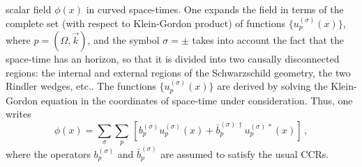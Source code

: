 scalar field $\phi(x)$ in curved space-times. One expands the
field in terms of the complete set (with respect to Klein-Gordon
product) of functions $\{u_p^{(\sigma)}(x)\}$, where $p=(\Omega,
{\vec k})$, and the symbol $\sigma = \pm$ takes into account the
fact that the space-time has an horizon, so that it is divided
into two causally disconnected regions: the internal and external
regions of the Schwarzschild geometry, the two Rindler wedges,
etc.. The functions $\{u_p^{(\sigma)}(x)\}$ are derived by solving
the Klein-Gordon equation in the coordinates of space-time under
consideration. Thus, one writes
\begin{equation}\label{phiR}
  \phi(x)= \sum_\sigma \sum_p \, \left[
  b_p^{(\sigma)}u_p^{(\sigma)}(x)+
  {\bar b}_p^{(\sigma)\, \dagger}u_p^{(\sigma)\, *}(x)
  \right]\,,
\end{equation}
where the operators $b_p^{(\sigma)}$ and ${\bar b}_p^{(\sigma)}$
are assumed to satisfy the usual CCRs.

